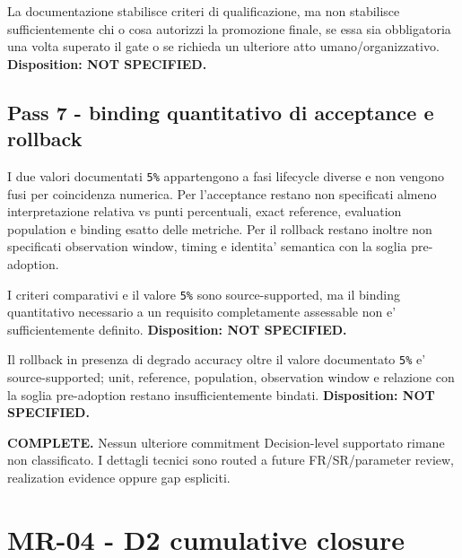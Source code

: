\documentclass[11pt,a4paper]{article}
\begin{document}
\begin{ddtaopen}[title={GAP-DERMA-DEPLOY-01 - Promotion authority after adaptation qualification}]
La documentazione stabilisce criteri di qualificazione, ma non stabilisce sufficientemente chi o cosa autorizzi la promozione finale, se essa sia obbligatoria una volta superato il gate o se richieda un ulteriore atto umano/organizzativo. \textbf{Disposition: NOT SPECIFIED.}
\end{ddtaopen}

\subsection{Pass 7 - binding quantitativo di acceptance e rollback}
I due valori documentati \texttt{5\%} appartengono a fasi lifecycle diverse e non vengono fusi per coincidenza numerica. Per l'acceptance restano non specificati almeno interpretazione relativa vs punti percentuali, exact reference, evaluation population e binding esatto delle metriche. Per il rollback restano inoltre non specificati observation window, timing e identita' semantica con la soglia pre-adoption.

\begin{ddtaopen}[title={GAP-DERMA-ACCEPT-BINDING-01}]
I criteri comparativi e il valore \texttt{5\%} sono source-supported, ma il binding quantitativo necessario a un requisito completamente assessable non e' sufficientemente definito. \textbf{Disposition: NOT SPECIFIED.}
\end{ddtaopen}

\begin{ddtaopen}[title={GAP-DERMA-ROLLBACK-BINDING-01}]
Il rollback in presenza di degrado accuracy oltre il valore documentato \texttt{5\%} e' source-supported; unit, reference, population, observation window e relazione con la soglia pre-adoption restano insufficientemente bindati. \textbf{Disposition: NOT SPECIFIED.}
\end{ddtaopen}

\begin{ddtacore}[title={Residual evidence sweep MR-04}]
\textbf{COMPLETE.} Nessun ulteriore commitment Decision-level supportato rimane non classificato. I dettagli tecnici sono routed a future FR/SR/parameter review, realization evidence oppure gap espliciti.
\end{ddtacore}

\clearpage
\section{MR-04 - D2 cumulative closure}
\end{document}
